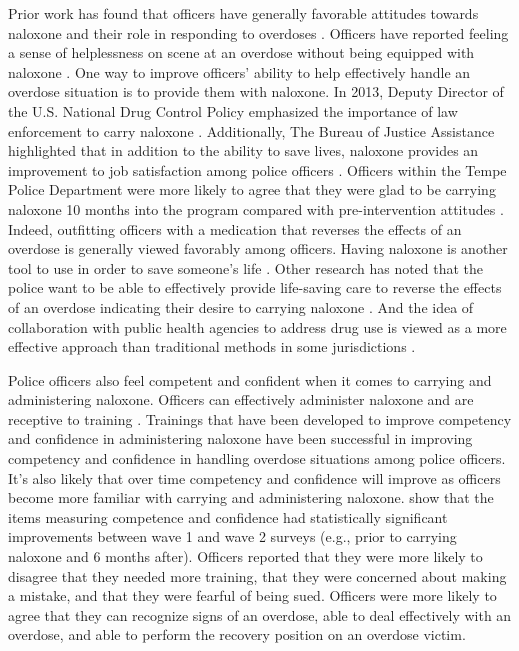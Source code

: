Prior work has found that officers have generally favorable attitudes towards naloxone and their role in responding to overdoses \parencite{purviance_law_2017, wagner_training_2016, white_narcan_2021}. Officers have reported feeling a sense of helplessness on scene at an overdose without being equipped with naloxone \parencite{banta-green_police_2013, white_moving_2021}. One way to improve officers’ ability to help effectively handle an overdose situation is to provide them with naloxone. In 2013, Deputy Director of the U.S. National Drug Control Policy emphasized the importance of law enforcement to carry naloxone \parencite{michael_botticelli_announcing_2013}. Additionally, The Bureau of Justice Assistance highlighted that in addition to the ability to save lives, naloxone provides an improvement to job satisfaction among police officers \parencite{bureau_of_justice_assistance_law_nodate}. Officers within the Tempe Police Department were more likely to agree that they were glad to be carrying naloxone 10 months into the program compared with pre-intervention attitudes \parencite{white_narcan_2021}. Indeed, outfitting officers with a medication that reverses the effects of an overdose is generally viewed favorably among officers. Having naloxone is another tool to use in order to save someone's life \parencite{lloyd_its_2023}. Other research has noted that the police want to be able to effectively provide life-saving care to reverse the effects of an overdose indicating their desire to carrying naloxone \parencite{purviance_law_2017}. And the idea of collaboration with public health agencies to address drug use is viewed as a more effective approach than traditional methods in some jurisdictions \parencite{lloyd_its_2023}.

Police officers also feel competent and confident when it comes to carrying and administering naloxone. Officers can effectively administer naloxone and are receptive to training \parencite{lloyd_its_2023, pourtaher_naloxone_2022, purviance_law_2017, wagner_training_2016}. Trainings that have been developed to improve competency and confidence in administering naloxone have been successful in improving competency and confidence in handling overdose situations among police officers. It's also likely that over time competency and confidence will improve as officers become more familiar with carrying and administering naloxone. \textcite{white_narcan_2021} show that the items measuring competence and confidence had statistically significant improvements between wave 1 and wave 2 surveys (e.g., prior to carrying naloxone and 6 months after). Officers reported that they were more likely to disagree that they needed more training, that they were concerned about making a mistake, and that they were fearful of being sued. Officers were more likely to agree that they can recognize signs of an overdose, able to deal effectively with an overdose, and able to perform the recovery position on an overdose victim.  

